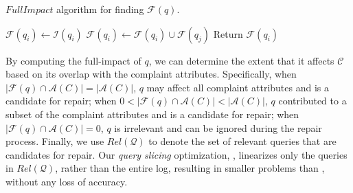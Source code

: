 

\begin{algorithm}[t]
\caption{$FullImpact$ algorithm for finding $\mathcal{F}(q)$.}
\label{alg:fullimpact}
\begin{algorithmic}[2]
\STATE $\mathcal{F}(q_i) \leftarrow \mathcal{I}(q_i)$
\STATE $\mathcal{F}(q_i) \leftarrow \mathcal{F}(q_i) \cup \mathcal{F}(q_j)$
\ENDIF
\ENDFOR
\STATE Return $\mathcal{F}(q_i)$
\end{algorithmic}
\end{algorithm}

By computing the full-impact of $q$, we can determine the extent that it affects $\mathcal{C}$
based on its overlap with the complaint attributes.
Specifically, 
when $|\mathcal{F}(q) \cap \mathcal{A}(C)|=|\mathcal{A}(C)|$, $q$ may affect all complaint attributes and is a candidate for repair; 
when $0 < |\mathcal{F}(q) \cap \mathcal{A}(C)| < |\mathcal{A}(C)|$, 
$q$ contributed to a subset of the complaint attributes and is a candidate for repair;
when $|\mathcal{F}(q) \cap \mathcal{A}(C)|=0$, $q$ is irrelevant 
and can be ignored during the repair process.
 
Finally, we use $Rel\mathcal{(Q)}$ to denote the set of relevant
queries that are candidates for repair. Our \emph{query slicing}
optimization, \qslice, linearizes only the queries in
$Rel\mathcal{(Q)}$, rather than the entire log, resulting in
smaller problems than \naive, without any loss of accuracy.

